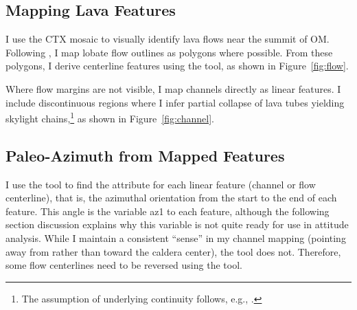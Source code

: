 
\subsection{Mapping Lava Features}\label{sec:mapping}

I use the \ac{CTX} mosaic to visually identify lava flows near the summit of \ac{OM}. Following \textcite{mouginis-mark_geologic_2021}, I map lobate flow outlines as polygons where possible. From these polygons, I derive centerline features using the  tool, as shown in Figure~\ref{fig:flow}.

Where flow margins are not visible, I map channels directly as linear features. I include discontinuous regions where I infer partial collapse of lava tubes yielding skylight chains,\footnote{The assumption of underlying continuity follows, e.g., \textcite{bleacher_olympus_2007,carr_geologic_2010,peters_lava_2021}.} as shown in Figure~\ref{fig:channel}.

\subsection{Paleo-Azimuth from Mapped Features}


I use the  tool to find the  attribute for each linear feature (channel or flow centerline), that is, the azimuthal orientation from the start to the end of each feature. This angle is the variable \ac{az1} to each feature, although the following section discussion explains why this variable is not quite ready for use in attitude analysis. While I maintain a consistent ``sense'' in my channel mapping (pointing away from rather than toward the caldera center), the  tool does not. Therefore, some flow centerlines need to be reversed using the  tool.

